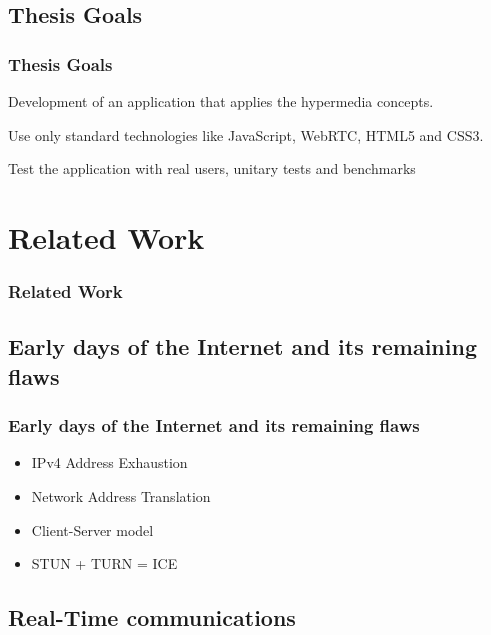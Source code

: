 \documentclass[t]{beamer}
\begin{document}
	\subsection{Thesis Goals} %
  		\begin{frame}[c]
		\frametitle{Thesis Goals}
		Development of an application that applies the hypermedia concepts.

		\vfill

		Use only standard technologies like JavaScript, WebRTC, HTML5 and CSS3.

		\vfill

		Test the application with real users, unitary tests and benchmarks
		\end{frame}


\section{Related Work}\label{related}

\begin{frame}[t,shrink]
\frametitle{Related Work} 
\tableofcontents[part=1,currentsection,hideothersubsections]
\tableofcontents[part=2,currentsection,hideothersubsections]
\end{frame}

	\subsection{Early days of the Internet and its remaining flaws}\label{early}


  		\begin{frame}[c]
		\frametitle{Early days of the Internet and its remaining flaws}
		\begin{itemize}
		\item IPv4 Address Exhaustion
		\vfill
		\item Network Address Translation	
		\vfill
		\item Client-Server model
		\vfill
		\item STUN + TURN = ICE
		\end{itemize}
		\end{frame}




	\subsection{Real-Time communications}\label{rtc}
\end{document}
